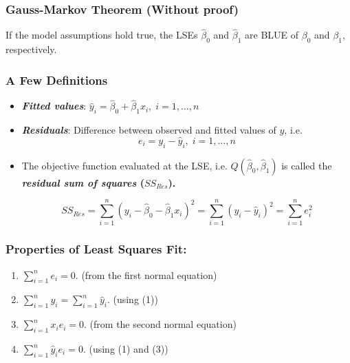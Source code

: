 \documentclass[10pt]{beamer} %
\begin{document}
\begin{frame}
   \frametitle{Gauss-Markov Theorem (Without proof)}
   \begin{theorem}
      If the model assumptions hold true, the LSEs $\hat\beta_0$ and
      $\hat\beta_1$ are BLUE of $\beta_0$ and $\beta_1$, respectively. 
   \end{theorem}
\end{frame}

\begin{frame}
   \frametitle{A Few Definitions}
   \begin{itemize}
      \item \emph{\textbf{Fitted values}}: $\hat y_i = \hat\beta_0 + \hat\beta_1x_i,\; i=1,\ldots,n$
         \bigskip
      \item \emph{\textbf{Residuals}}: Difference between observed and
         fitted values of $y$, i.e. $$e_i = y_i - \hat y_i,\; i=1,\ldots,n$$
      \item The objective function evaluated at the LSE, i.e.
         $Q(\hat\beta_0,\hat\beta_1)$ is called the \textbf{\emph{residual sum
         of squares} ($SS_{Res}$).}

         $$SS_{Res} = \sum_{i=1}^n (y_i - \hat\beta_0 - \hat\beta_1x_i)^2 =
         \sum_{i=1}^{n} \left( y_i - \widehat{y}_i \right)^2 = \sum_{i=1}^{n}
         e_i^2$$

   \end{itemize}
\end{frame}

%
\begin{frame}
   \frametitle{Properties of Least Squares Fit:}
   \begin{enumerate}
      \item $\sum_{i=1}^{n}e_i = 0.$ (from the first normal equation)
         \vspace{0.5cm}

      \item $\sum_{i=1}^{n} y_i = \sum_{i=1}^{n} \hat y_i$. (using (1))
         \vspace{0.5cm}

      \item $\sum_{i=1}^{n} x_i e_i = 0.$ (from the second normal equation)
         \vspace{0.5cm}

      \item $\sum_{i=1}^{n}  \hat y_i e_i = 0.$ (using (1) and (3))
   \end{enumerate}	

\end{frame}
\end{document}
